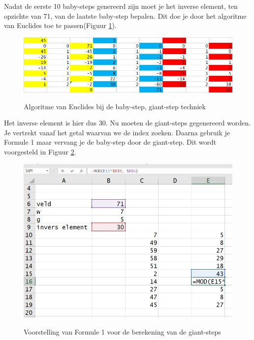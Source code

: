  
Nadat de eerste 10 baby-steps genereerd zijn moet je het inverse element, ten opzichte van 71, van de laatste baby-step bepalen. Dit doe je door het algoritme van Euclides toe te passen(Figuur \ref{fig:babystep_giantstep_2}).

\begin{figure}
  \begin{center}
  \caption{Algoritme van Euclides bij de baby-step, giant-step techniek}
  \includegraphics[width=\textwidth]{babystep_giantstep_2}
  \label{fig:babystep_giantstep_2}
  \end{center}
\end{figure}
Het inverse element is hier dus 30. Nu moeten de giant-steps gegenereerd worden. Je vertrekt vanaf het getal waarvan we de index zoeken. Daarna gebruik je Formule 1 maar vervang je de baby-step door de giant-step. Dit wordt voorgesteld in Figuur \ref{fig:babystep_giantstep_3}.


\begin{figure}
  \begin{center}
  \caption{Voorstelling van Formule 1 voor de berekening van de giant-steps}
  \includegraphics[width=\textwidth]{babystep_giantstep_3}
  \label{fig:babystep_giantstep_3}
  \end{center}
\end{figure}
  
